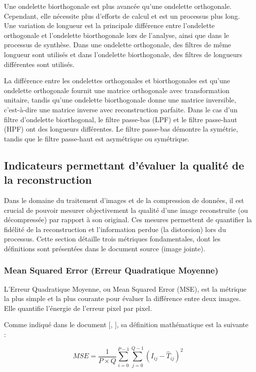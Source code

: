 Une ondelette biorthogonale est plus avancée qu'une ondelette orthogonale. Cependant, elle nécessite plus d'efforts de calcul et est un processus plus long. Une variation de longueur est la principale différence entre l'ondelette orthogonale et l'ondelette biorthogonale lors de l'analyse, ainsi que dans le processus de synthèse. Dans une ondelette orthogonale, des filtres de même longueur sont utilisés et dans l'ondelette biorthogonale, des filtres de longueurs différentes sont utilisés.

La différence entre les ondelettes orthogonales et biorthogonales est qu'une ondelette orthogonale fournit une matrice orthogonale avec transformation unitaire, tandis qu'une ondelette biorthogonale donne une matrice inversible, c'est-à-dire une matrice inverse avec reconstruction parfaite. Dans le cas d'un filtre d'ondelette biorthogonal, le filtre passe-bas (LPF) et le filtre passe-haut (HPF) ont des longueurs différentes. Le filtre passe-bas démontre la symétrie, tandis que le filtre passe-haut est asymétrique ou symétrique.

\subsection{Indicateurs permettant d'évaluer la qualité de la reconstruction}

Dans le domaine du traitement d'images et de la compression de données, il est crucial de pouvoir mesurer objectivement la qualité d'une image reconstruite (ou décompressée) par rapport à son original. Ces mesures permettent de quantifier la fidélité de la reconstruction et l'information perdue (la distorsion) lors du processus. Cette section détaille trois métriques fondamentales, dont les définitions sont présentées dans le document source (image jointe).

\subsubsection{Mean Squared Error (Erreur Quadratique Moyenne)}

L'Erreur Quadratique Moyenne, ou Mean Squared Error (MSE), est la métrique la plus simple et la plus courante pour évaluer la différence entre deux images. Elle quantifie l'énergie de l'erreur pixel par pixel.

Comme indiqué dans le document [\cite{22}, \cite{23}], sa définition mathématique est la suivante :

\begin{equation}
MSE = \frac{1}{P \times Q} \sum_{i=0}^{P-1} \sum_{j=0}^{Q-1} (I_{ij} - \hat{T}_{ij})^2
\end{equation}

